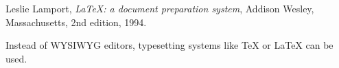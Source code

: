 \begin{thebibliography}{9}

  Leslie Lamport,
  \textit{\LaTeX: a document preparation system},
  Addison Wesley, Massachusetts,
  2nd edition,
  1994.

\end{thebibliography}

Instead of WYSIWYG editors, typesetting systems like \TeX{} or \LaTeX{} \cite{lamport94} can be used.